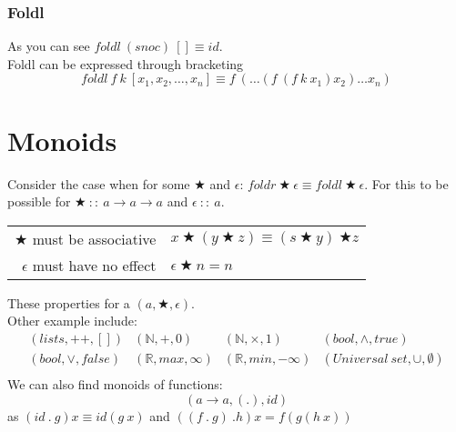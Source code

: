 \documentclass{report}
\begin{document}
        \subsubsection*{Foldl}
            As you can see $foldl \ (snoc) \ [] \equiv id$.
            \\ Foldl can be expressed through bracketing
            \[foldl \ f \ k \ [x_1, x_2, \dots, x_n] \equiv f \ (\dots (f \ (f \ k \ x_1) x_2) \dots x_n)\]

    \section*{Monoids}
        Consider the case when for some $\bigstar $ and $\epsilon$: $foldr \ \bigstar \ \epsilon \equiv foldl \ \bigstar \ \epsilon$.
        For this to be possible for $\bigstar \ :: \ a \to a \to a$ and $\epsilon \ :: \ a$.
        \begin{center}
            \begin{tabular}{r l}
                $\bigstar$ must be associative & $x \ \bigstar \ (y \ \bigstar \ z) \equiv (s \ \bigstar \ y) \ \bigstar z$ \\
                $\epsilon$ must have no effect & $\epsilon \ \bigstar \ n = n$ \\
            \end{tabular}
        \end{center}
        These properties for a  $(a, \bigstar, \epsilon)$.
        \\ Other example include:
        \[\begin{matrix}
            (lists, ++, []) & (\mathbb{N}, +, 0) & (\mathbb{N}, \times, 1) & (bool, \land, true) \\
            (bool, \lor, false) & (\mathbb{R}, max, \infty) & (\mathbb{R}, min, -\infty) & (Universal \ set, \cup, \emptyset) \\
        \end{matrix}\]
        We can also find monoids of functions:
        \[(a \to a, (.), id)\]
        as $(id \ . \ g) x \equiv id (g \ x)$ and $((f \ . \ g) \ . h) x = f(g(h \ x))$
    
\end{document}
